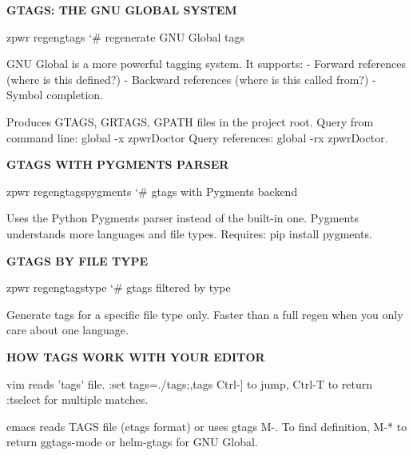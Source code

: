 \documentclass[11pt,a4paper,twoside]{book}
\begin{document}
\vspace{12pt}
{\bfseries\color{neonyellow} GTAGS: THE GNU GLOBAL SYSTEM}\vspace{4pt}

\begin{codebox}
\color{neongreen}zpwr regengtags                     {\char`\#} regenerate GNU Global tags\\
\end{codebox}

GNU Global is a more powerful tagging system. It supports: - Forward references (where is this defined?) - Backward references (where is this called from?) - Symbol completion.

Produces GTAGS, GRTAGS, GPATH files in the project root. Query from command line: global -x zpwrDoctor Query references: global -rx zpwrDoctor.


\vspace{12pt}
{\bfseries\color{neonyellow} GTAGS WITH PYGMENTS PARSER}\vspace{4pt}

\begin{codebox}
\color{neongreen}zpwr regengtagspygments             {\char`\#} gtags with Pygments backend\\
\end{codebox}

Uses the Python Pygments parser instead of the built-in one. Pygments understands more languages and file types. Requires: pip install pygments.


\vspace{12pt}
{\bfseries\color{neonyellow} GTAGS BY FILE TYPE}\vspace{4pt}

\begin{codebox}
\color{neongreen}zpwr regengtagstype                 {\char`\#} gtags filtered by type\\
\end{codebox}

Generate tags for a specific file type only. Faster than a full regen when you only care about one language.


\vspace{12pt}
{\bfseries\color{neonyellow} HOW TAGS WORK WITH YOUR \textbf{EDITOR}}\vspace{4pt}

vim    reads 'tags' file. :set tags=./tags;,tags Ctrl-] to jump, Ctrl-T to return :tselect for multiple matches.

emacs  reads TAGS file (etags format) or uses gtags M-. To find definition, M-* to return ggtags-mode or helm-gtags for GNU Global.
\end{document}
